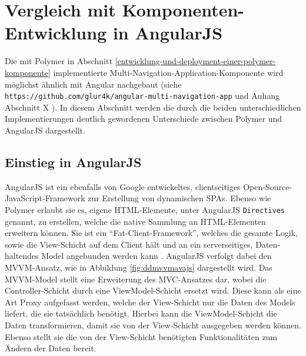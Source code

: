 \section{Vergleich mit Komponenten-Entwicklung in AngularJS}\label{vergleich-mit-komponenten-entwicklung-in-angularjs}

Die mit Polymer in Abschnitt \ref{entwicklung-und-deployment-einer-polymer-komponente} implementierte Multi-Navigation-Application-Komponente wird möglichst ähnlich mit Angular nachgebaut (siehe \texttt{https://github.com/glur4k/angular-multi-navigation-app} und Anhang Abschnitt X ). In diesem Abschnitt werden die durch die beiden unterschiedlichen Implementierungen deutlich gewordenen Unterschiede zwischen Polymer und AngularJS dargestellt.


\subsection{Einstieg in AngularJS}\label{einstieg-in-angularjs}

AngularJS ist ein ebenfalls von Google entwickeltes, clientseitiges Open-Source-JavaScript-Framework zur Erstellung von dynamischen \ac{SPA}s. Ebenso wie Polymer erlaubt sie es, eigene \ac{HTML}-Elemente, unter AngularJS \texttt{Directives} genannt, zu erstellen, welche die native Sammlung an \ac{HTML}-Elementen erweitern können. Sie ist ein ``Fat-Client-Framework'', welches die gesamte Logik, sowie die View-Schicht auf dem Client hält und an ein serverseitiges, Daten-haltendes Model angebunden werden kann \cite{citeulike:13920434}. AngularJS verfolgt dabei den \ac{MVVM}-Ansatz, wie in Abbildung \ref{fig:ddmvvmavajs} dargestellt wird. Das \ac{MVVM}-Model stellt eine Erweiterung des \ac{MVC}-Ansatzes dar, wobei die Controller-Schicht durch eine ViewModel-Schicht ersetzt wird. Diese kann als eine Art Proxy aufgefasst werden, welche der View-Schicht nur die Daten des Models liefert, die sie tatsächlich benötigt. Hierbei kann die ViewModel-Schicht die Daten transformieren, damit sie von der View-Schicht ausgegeben werden können. Ebenso stellt sie die von der View-Schicht benötigten Funktionalitäten zum Ändern der Daten bereit.

